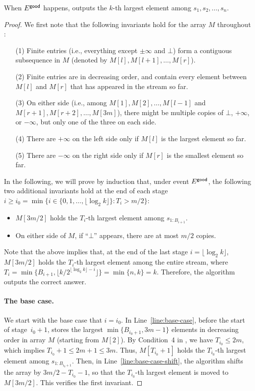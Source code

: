 \begin{lemma}\label{lemma:exact-correctness}
    When $E^{\textsf{good}}$ happens,  outputs the $k$-th largest element among $s_1, s_2, \ldots, s_n$.
\end{lemma}
\begin{proof}
  We first note that the following invariants hold for the array $M$ throughout :
    \begin{enumerate}
        \item[(1)] Finite entries (i.e., everything except $\pm\infty$ and $\bot$) form a contiguous subsequence in $M$ (denoted by $M[l], M[l + 1],  \ldots, M[r]$).
        \item[(2)] Finite entries are in decreasing order, and contain every element between $M[l]$ and $M[r]$ that has appeared in the stream so far.
        \item[(3)] On either side (i.e., among $M[1], M[2], \ldots, M[l-1]$ and $M[r+1], M[r+2], \ldots, M[3m]$), there might be multiple copies of $\bot$, $+\infty$, or $-\infty$, but only one of the three on each side.
        \item[(4)] There are $+\infty$ on the left side only if $M[l]$ is the largest element so far.
        \item[(5)] There are $-\infty$ on the right side only if $M[r]$ is the smallest element so far.
    \end{enumerate}

    In the following, we will prove by induction that, under event $E^{\textsf{good}}$, the following two additional invariants hold at the end of each stage $i \ge i_0 = \min\{i \in \{0, 1, \ldots, \lfloor \log_2k\rfloor\}: T_i > m/2\}$:
    \begin{itemize}
        \item $M[3m/2]$ holds the $T_i$-th largest element among $s_{1:B_{i+1}}$.
        \item On either side of $M$, if ``$\bot$'' appears, there are at most $m/2$ copies.
    \end{itemize}
    Note that the above implies that, at the end of the last stage $i = \lfloor \log_2 k \rfloor$, $M[3m/2]$ holds the $T_i$-th largest element among the entire stream, where $T_i = \min\{B_{i+1}, \lfloor k / 2^{\lfloor\log_2 k\rfloor - i}\rfloor\} = \min\{n, k\} = k$. Therefore, the algorithm outputs the correct answer.
    
    \paragraph{The base case.} We start with the base case that $i = i_0$. In Line~\ref{line:base-case}, before the start of stage~$i_0+1$,  stores the largest $\min\{B_{i_0 + 1}, 3m-1\}$ elements in decreasing order in array $M$ (starting from $M[2]$). By Condition~4 in , we have $T_{i_0} \le 2m$, which implies $T_{i_0} + 1 \le 2m + 1 \le 3m$. Thus, $M[T_{i_0} + 1]$ holds the $T_{i_0}$-th largest element among $s_{1:B_{i_0+1}}$. Then, in Line~\ref{line:base-case-shift}, the algorithm shifts the array by $3m/2 - T_{i_0}-1$, so that the $T_{i_0}$-th largest element is moved to $M[3m/2]$. This verifies the first invariant.
    

\end{proof}
